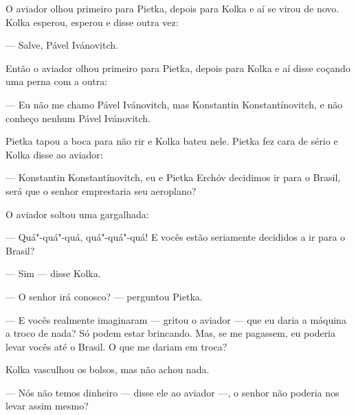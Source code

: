 O aviador olhou primeiro para Pietka, depois para Kolka e aí se virou de
novo. Kolka esperou, esperou e disse outra vez:

--- Salve, Pável Ivánovitch.

Então o aviador olhou primeiro para Pietka, depois para Kolka e aí disse
coçando uma perna com a outra:

--- Eu não me chamo Pável Ivánovitch, mas Konstantin Konstantínovitch, e
não conheço nenhum Pável Ivánovitch.

Pietka tapou a boca para não rir e Kolka bateu nele. Pietka fez cara de
sério e Kolka disse ao aviador:

--- Konstantin Konstantínovitch, eu e Pietka Erchóv decidimos ir para o
Brasil, será que o senhor emprestaria seu aeroplano?

O aviador soltou uma gargalhada:

--- Quá"-quá"-quá, quá"-quá"-quá! E vocês estão seriamente decididos a ir
para o Brasil?

--- Sim --- disse Kolka.

--- O senhor irá conosco? --- perguntou Pietka.

--- E vocês realmente imaginaram --- gritou o aviador --- que eu daria a
máquina a troco de nada? Só podem estar brincando. Mas, se me pagassem,
eu poderia levar vocês até o Brasil. O que me dariam em troca?

Kolka vasculhou os bolsos, mas não achou nada.

--- Nós não temos dinheiro --- disse ele ao aviador ---, o senhor não
poderia nos levar assim mesmo?

